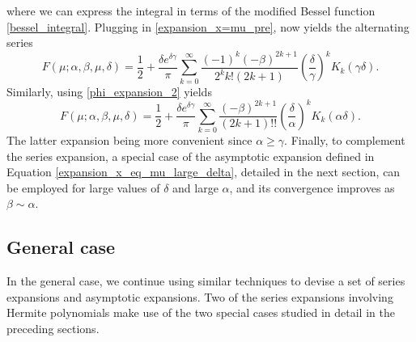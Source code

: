 \documentclass[10pt,a4paper,oneside]{article}
\numberwithin{equation}{section}
\begin{document}
where we can express the integral in terms of the modified Bessel function \eqref{bessel_integral}. Plugging in \eqref{expansion_x=mu_pre}, now yields the alternating series
\begin{equation}\label{series_x=mu_1}
F(\mu; \alpha, \beta, \mu, \delta) = \frac{1}{2} + \frac{\delta e^{\delta \gamma}}{\pi} \sum_{k=0}^{\infty} \frac{(-1)^k (-\beta)^{2k+1}}{2^k k! (2k + 1)} \left(\frac{\delta}{\gamma}\right)^k K_k(\gamma \delta).
\end{equation}
Similarly, using \eqref{phi_expansion_2} yields
\begin{equation}\label{series_x=mu_2}
F(\mu; \alpha, \beta, \mu, \delta) = \frac{1}{2} + \frac{\delta e^{\delta \gamma}}{\pi} \sum_{k=0}^{\infty} \frac{(-\beta)^{2k+1}}{(2k + 1)!!} \left(\frac{\delta}{\alpha}\right)^k K_k(\alpha \delta).
\end{equation}
The latter expansion being more convenient since $\alpha \ge \gamma$. Finally, to complement the series expansion, a special case of the asymptotic expansion defined in Equation \eqref{expansion_x_eq_mu_large_delta}, detailed in the next section, can be employed for large values of $\delta$ and large $\alpha$, and its convergence improves as $\beta \sim \alpha$.

\subsection{General case}\label{section_general_case}
In the general case, we continue using similar techniques to devise a set of series expansions and asymptotic expansions. Two of the series expansions involving Hermite polynomials make use of the two special cases studied in detail in the preceding sections.
\end{document}
